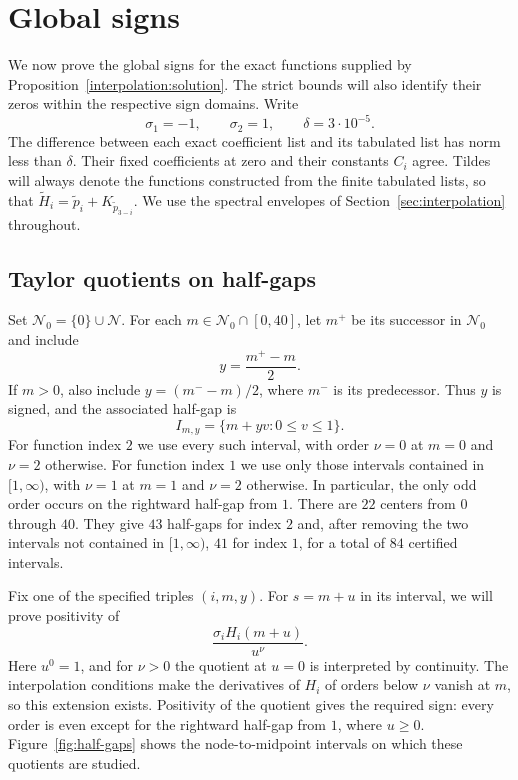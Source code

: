 \section{Global signs}\label{sec:signs}

We now prove the global signs for the exact functions supplied by
Proposition~\ref{interpolation:solution}.  The strict bounds will also
identify their zeros within the respective sign domains.  Write
\[
  \sigma_1=-1,\qquad \sigma_2=1,\qquad
  \delta=3\cdot10^{-5}.
\]
The difference between each exact coefficient list and its tabulated list has
norm less than $\delta$.  Their fixed coefficients at zero and their constants
$C_i$ agree.  Tildes will always denote the functions constructed from the
finite tabulated lists, so that
$\widetilde H_i=\widetilde p_i+K_{\widetilde p_{3-i}}$.
We use the spectral envelopes of Section~\ref{sec:interpolation} throughout.

\subsection{Taylor quotients on half-gaps}

Set $\mathcal N_0=\{0\}\cup\mathcal N$.  For each
$m\in\mathcal N_0\cap[0,40]$, let $m^+$ be its successor in
$\mathcal N_0$ and include
\[
  y=\frac{m^+-m}{2}.
\]
If $m>0$, also include $y=(m^--m)/2$, where $m^-$ is its predecessor.
Thus $y$ is signed, and the associated half-gap is
\[
  I_{m,y}=\{m+yv:0\le v\le1\}.
\]
For function index $2$ we use every such interval, with order
$\nu=0$ at $m=0$ and $\nu=2$ otherwise.  For function index $1$ we use only
those intervals contained in $[1,\infty)$, with $\nu=1$ at $m=1$ and
$\nu=2$ otherwise.  In particular, the only odd order occurs on the
rightward half-gap from $1$.
There are $22$ centers from $0$ through $40$.  They give $43$ half-gaps for
index $2$ and, after removing the two intervals not contained in $[1,\infty)$, $41$ for index
$1$, for a total of $84$ certified intervals.

Fix one of the specified triples $(i,m,y)$.  For $s=m+u$ in its interval,
we will prove positivity of
\[
 \frac{\sigma_i H_i(m+u)}{u^\nu}.
\]
Here $u^0=1$, and for $\nu>0$ the quotient at $u=0$ is interpreted by
continuity.  The interpolation conditions make the derivatives of $H_i$
of orders below $\nu$ vanish at $m$, so this extension exists.  Positivity
of the quotient gives the required sign: every order is even except for
the rightward half-gap from $1$, where $u\ge0$.
Figure~\ref{fig:half-gaps} shows the node-to-midpoint intervals on which
these quotients are studied.



